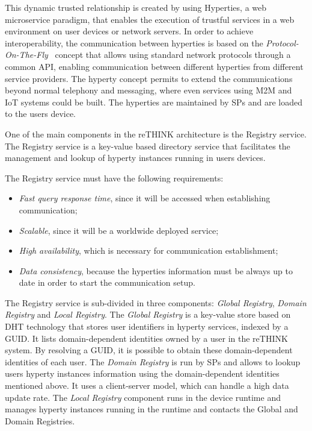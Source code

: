 This dynamic trusted relationship is created by using \ac{Hyperties}, a web microservice paradigm, that enables the execution of trustful services in a web environment on user devices or network servers.
In order to achieve interoperability, the communication between hyperties is based on the \textit{Protocol-On-The-Fly}~\cite{protofly} concept that allows using standard network protocols through a common API, enabling communication between different hyperties from different service providers.
The hyperty concept permits to extend the communications beyond normal telephony and messaging, where even services using \ac{M2M} and \ac{IoT} systems could be built.
The hyperties are maintained by \acp{SP} and are loaded to the users device.

One of the main components in the reTHINK architecture is the Registry service.
The Registry service is a key-value based directory service that facilitates the management and lookup of hyperty instances running in users devices.

The Registry service must have the following requirements:
\begin{itemize}
  \item \textit{Fast query response time}, since it will be accessed when establishing communication;
	\item \textit{Scalable}, since it will be a worldwide deployed service;
  \item \textit{High availability}, which is necessary for communication establishment;
  \item \textit{Data consistency}, because the hyperties information must be always up to date in order to start the communication setup.
\end{itemize}

The Registry service is sub-divided in three components: \textit{Global Registry}, \textit{Domain Registry} and \textit{Local Registry}.
The \textit{Global Registry} is a key-value store based on \ac{DHT} technology that stores user identifiers in hyperty services, indexed by a \ac{GUID}.
It lists domain-dependent identities owned by a user in the reTHINK system.
By resolving a \ac{GUID}, it is possible to obtain these domain-dependent identities of each user.
The \textit{Domain Registry} is run by \acp{SP} and allows to lookup users hyperty instances information using the domain-dependent identities mentioned above.
It uses a client-server model, which can handle a high data update rate.
The \textit{Local Registry} component runs in the device runtime and manages hyperty instances running in the runtime and contacts the Global and Domain Registries.

